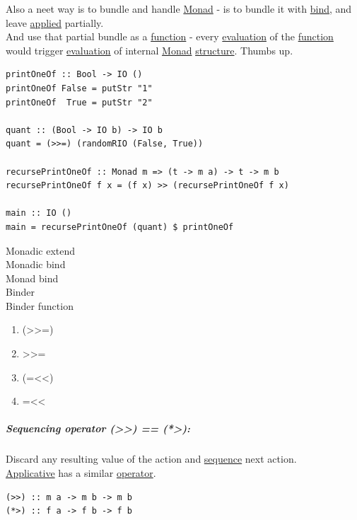 \documentclass[a4paper,14pt,oneside]{book}
\begin{document}
Also a neet way is to bundle and handle \hyperref[org27993ff]{Monad} - is to bundle it with \hyperref[org624c8a5]{bind}, and leave \hyperref[org277c4f3]{applied} partially.\\
And use that partial bundle as a \hyperref[org25ee224]{function} - every \hyperref[org0a29cc3]{evaluation} of the \hyperref[org25ee224]{function} would trigger \hyperref[org0a29cc3]{evaluation} of internal \hyperref[org27993ff]{Monad} \hyperref[org2f999c6]{structure}. Thumbs up.\\
\begin{verbatim}
printOneOf :: Bool -> IO ()
printOneOf False = putStr "1"
printOneOf  True = putStr "2"

quant :: (Bool -> IO b) -> IO b
quant = (>>=) (randomRIO (False, True))

recursePrintOneOf :: Monad m => (t -> m a) -> t -> m b
recursePrintOneOf f x = (f x) >> (recursePrintOneOf f x)

main :: IO ()
main = recursePrintOneOf (quant) $ printOneOf
\end{verbatim}

\subsubparagraph{\emph{*}}
\label{sec:orgae52272}

\label{orgd29d1f2}Monadic extend\\
\label{org68dc635}Monadic bind\\
\label{org44a0191}Monad bind\\
\label{orgb9019f9}Binder\\
\label{org11ce481}Binder function\\

\begin{enumerate}
\item (>>=)
\label{sec:orgd010358}

\item >>=
\label{sec:org048a3f7}

\item (=<<)
\label{sec:orgac652bd}

\item =<<
\label{sec:org04d2b29}
\end{enumerate}

\subparagraph{\label{org0b2270e}Sequencing operator (>>) == (*>):}
\label{sec:org9aa23b1}
Discard any resulting value of the action and \hyperref[org5549fb7]{sequence} next action.\\
\hyperref[org9f3bcb2]{Applicative} has a similar \hyperref[orgbff3456]{operator}.\\
\begin{verbatim}
(>>) :: m a -> m b -> m b
(*>) :: f a -> f b -> f b
\end{verbatim}
\end{document}
